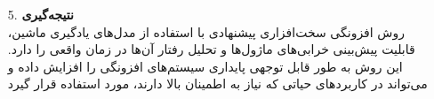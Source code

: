 \begin{qsolve}
\begin{enumerate}
		
		
		\item [5.]
		\textbf{نتیجه‌گیری}\\				روش افزونگی سخت‌افزاری پیشنهادی با استفاده از مدل‌های یادگیری ماشین، قابلیت پیش‌بینی خرابی‌های ماژول‌ها و تحلیل رفتار آن‌ها در زمان واقعی را دارد. این روش به طور قابل توجهی پایداری سیستم‌های افزونگی را افزایش داده و می‌تواند در کاربردهای حیاتی که نیاز به اطمینان بالا دارند، مورد استفاده قرار گیرد
	
	
		
	\end{enumerate}
\end{qsolve}
		



		
		
		
		
